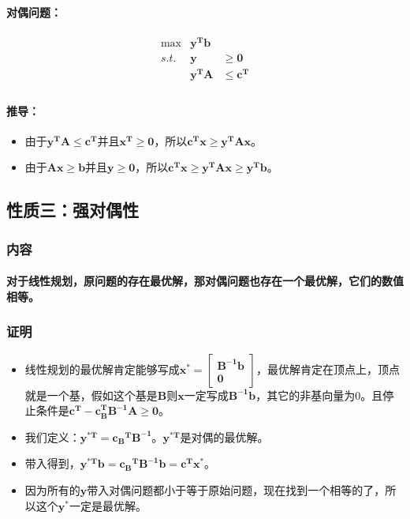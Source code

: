 		\paragraph{对偶问题：}
			\[
			\begin{array}{rrl}
 				\max & \mathbf{y^T b} &    \\
 				s.t. & \mathbf{y}  & \mathbf{ \geq 0 }  \\
      				 	& \mathbf{y^T A} &  \mathbf{ \leq  c^{T} }  \\
			\end{array} \nonumber
			\]
		\paragraph{推导：}
		\begin{itemize}
			\item 由于$\mathbf{y^T A \leq c^T}$并且$\mathbf{x^T \geq 0}$，所以$\mathbf{c^T x \geq y^T A  x }$。
			\item 由于$\mathbf{Ax \geq b}$并且$\mathbf{y \geq 0}$，所以$\mathbf{c^T x \geq y^T A  x \geq y^T b }$。
		\end{itemize}
	\subsection{性质三：强对偶性}
	\subsubsection{内容}
	\paragraph{}\textbf{对于线性规划，原问题的存在最优解，那对偶问题也存在一个最优解，它们的数值相等。}
	\subsubsection{证明}
		\begin{itemize}
			\item 线性规划的最优解肯定能够写成$\mathbf{x^*= \left[ \begin{array}{c} \mathbf{B^{-1}b}\\ 0 \end{array}\right]}$，最优解肯定在顶点上，顶点就是一个基，假如这个基是$\mathbf{B}$则$\mathbf{x}$一定写成$\mathbf{B^{-1}b}$，其它的非基向量为0。且停止条件是$\mathbf{c^T - c_B^T B^{-1} A \geq 0}$。
			\item 我们定义：$\mathbf{y^{*T}={c_B}^T {B}^{-1}}$。$\mathbf{y^{*T}}$是对偶的最优解。
			\item 带入得到，$\mathbf{y^{*T} b = {c_B}^T {B}^{-1} b = {c}^T {x^*}}$。
			\item 因为所有的$\mathbf{y}$带入对偶问题都小于等于原始问题，现在找到一个相等的了，所以这个$\mathbf{y^*}$一定是最优解。
		\end{itemize}
